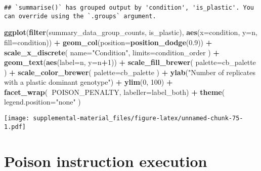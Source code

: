 \documentclass[]{book}
\newenvironment{Shaded}{\begin{snugshade}}{\end{snugshade}}
\newcommand{\DataTypeTok}[1]{\textcolor[rgb]{0.13,0.29,0.53}{#1}}
\newcommand{\DecValTok}[1]{\textcolor[rgb]{0.00,0.00,0.81}{#1}}
\newcommand{\FloatTok}[1]{\textcolor[rgb]{0.00,0.00,0.81}{#1}}
\newcommand{\KeywordTok}[1]{\textcolor[rgb]{0.13,0.29,0.53}{\textbf{#1}}}
\newcommand{\NormalTok}[1]{#1}
\newcommand{\OperatorTok}[1]{\textcolor[rgb]{0.81,0.36,0.00}{\textbf{#1}}}
\newcommand{\StringTok}[1]{\textcolor[rgb]{0.31,0.60,0.02}{#1}}
\begin{document}
\begin{verbatim}
## `summarise()` has grouped output by 'condition', 'is_plastic'. You can override using the `.groups` argument.
\end{verbatim}

\begin{Shaded}
\begin{Highlighting}[]
\KeywordTok{ggplot}\NormalTok{(}\KeywordTok{filter}\NormalTok{(summary_data_group_counts, is_plastic), }\KeywordTok{aes}\NormalTok{(}\DataTypeTok{x=}\NormalTok{condition, }\DataTypeTok{y=}\NormalTok{n, }\DataTypeTok{fill=}\NormalTok{condition)) }\OperatorTok{+}
\StringTok{  }\KeywordTok{geom_col}\NormalTok{(}\DataTypeTok{position=}\KeywordTok{position_dodge}\NormalTok{(}\FloatTok{0.9}\NormalTok{)) }\OperatorTok{+}
\StringTok{  }\KeywordTok{scale_x_discrete}\NormalTok{(}
    \DataTypeTok{name=}\StringTok{"Condition"}\NormalTok{,}
    \DataTypeTok{limits=}\NormalTok{condition_order}
\NormalTok{  ) }\OperatorTok{+}
\StringTok{  }\KeywordTok{geom_text}\NormalTok{(}\KeywordTok{aes}\NormalTok{(}\DataTypeTok{label=}\NormalTok{n, }\DataTypeTok{y=}\NormalTok{n}\OperatorTok{+}\DecValTok{1}\NormalTok{)) }\OperatorTok{+}
\StringTok{  }\KeywordTok{scale_fill_brewer}\NormalTok{(}
    \DataTypeTok{palette=}\NormalTok{cb_palette}
\NormalTok{  ) }\OperatorTok{+}
\StringTok{  }\KeywordTok{scale_color_brewer}\NormalTok{(}
    \DataTypeTok{palette=}\NormalTok{cb_palette}
\NormalTok{  ) }\OperatorTok{+}
\StringTok{  }\KeywordTok{ylab}\NormalTok{(}\StringTok{"Number of replicates with a plastic dominant genotype"}\NormalTok{) }\OperatorTok{+}
\StringTok{  }\KeywordTok{ylim}\NormalTok{(}\DecValTok{0}\NormalTok{, }\DecValTok{100}\NormalTok{) }\OperatorTok{+}
\StringTok{  }\KeywordTok{facet_wrap}\NormalTok{(}\OperatorTok{~}\NormalTok{POISON_PENALTY, }\DataTypeTok{labeller=}\NormalTok{label_both) }\OperatorTok{+}
\StringTok{  }\KeywordTok{theme}\NormalTok{(}
    \DataTypeTok{legend.position=}\StringTok{"none"}
\NormalTok{  )}
\end{Highlighting}
\end{Shaded}

\texttt{[image: supplemental-material\_files/figure-latex/unnamed-chunk-75-1.pdf]}

\hypertarget{poison-instruction-execution}{%
\section{Poison instruction execution}\label{poison-instruction-execution}}
\end{document}
